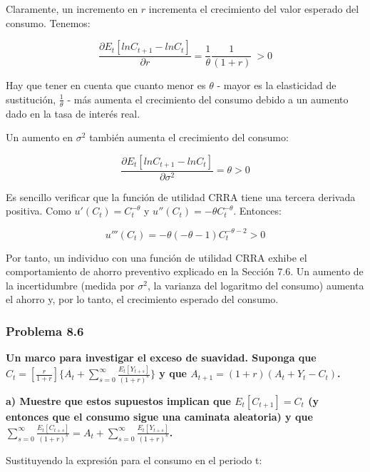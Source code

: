 \documentclass[
]{article}
\begin{document}
Claramente, un incremento en \(r\) incrementa el crecimiento del valor
esperado del consumo. Tenemos:

\begin{equation}
\frac{ \partial {E_t[lnC_{t+1}-lnC_t]}}{\partial r}= \frac{1}{\theta} \frac{1}{(1+r)} \ > 0
\end{equation}

Hay que tener en cuenta que cuanto menor es \(\theta\) - mayor es la
elasticidad de sustitución, \(\frac{1}{\theta}\) - más aumenta el
crecimiento del consumo debido a un aumento dado en la tasa de interés
real.

Un aumento en \(\sigma^2\) también aumenta el crecimiento del consumo:

\begin{equation}
\frac{ \partial {E_t[lnC_{t+1}-lnC_t]}}{\partial \sigma^2}= \theta > 0
\end{equation}

Es sencillo verificar que la función de utilidad CRRA tiene una tercera
derivada positiva. Como \(u'(C_t )=C_t^{-\theta }\) y
\(u''(C_t )=-\theta C_t^{-\theta }\). Entonces:

\begin{equation}
u'''(C_t )=-\theta (-\theta -1) C_t^{-\theta - 2} > 0
\end{equation}

Por tanto, un individuo con una función de utilidad CRRA exhibe el
comportamiento de ahorro preventivo explicado en la Sección 7.6. Un
aumento de la incertidumbre (medida por \(\sigma^2\), la varianza del
logaritmo del consumo) aumenta el ahorro y, por lo tanto, el crecimiento
esperado del consumo.

\hypertarget{problema-8.6}{%
\subsubsection{Problema 8.6}\label{problema-8.6}}

\textbf{Un marco para investigar el exceso de suavidad. Suponga que
\(C_t=[\frac{r}{1+r}]\{A_t+\sum^\infty_{s=0}\frac{E_t[Y_{t+s}]}{(1+r)^s}\}\)
y que \(A_{t+1}=(1+r)(A_t+Y_t-C_t)\).}

\textbf{a) Muestre que estos supuestos implican que \(E_t[C_{t+1}]=C_t\)
(y entonces que el consumo sigue una caminata aleatoria) y que
\(\sum^\infty_{s=0}\frac{E_t[C_{t+s}]}{(1+r)^s}=A_t+\sum^\infty_{s=0}\frac{E_t[Y_{t+s}]}{(1+r)^s}\).}

Sustituyendo la expresión para el consumo en el periodo t:
\end{document}

